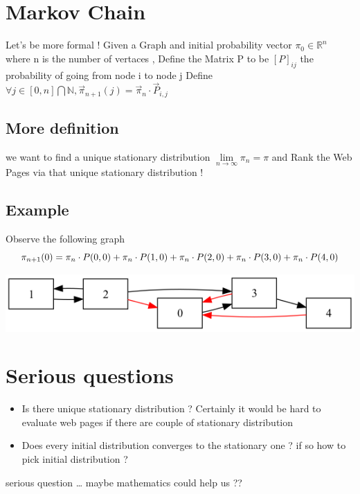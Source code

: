 \documentclass[11pt]{article}
\begin{document}
\section*{Markov Chain}
\label{sec:org1f68fba}
Let's be more formal !
Given a Graph and initial probability vector \(\pi _0 \in \mathbb{R}^n\)  where n is the number of vertaces ,
Define the Matrix P to be \([P]_{ij}\) the probability of going from node i to node j
Define \(\forall j \in [0,n]\bigcap \mathbb{N} , \vec \pi _{n+1} (j) = \vec \pi _n \cdot \vec P_{i,j}\)
\subsection*{More definition}
\label{sec:org8770bd6}
we want to find a unique stationary
distribution \(\lim\limits_{n\to \infty} \pi _n = \pi\) and Rank the Web Pages via that unique stationary distribution !

\subsection*{Example}
\label{sec:org2123d79}
Observe the following graph
\[ \pi _{n+1}(0) = \pi _n \cdot P(0,0) + \pi _n \cdot P(1,0) +\pi _n \cdot P(2,0) \\ +\pi _n \cdot P(3,0) + \pi _n \cdot P(4,0) \]

\begin{center}
\includegraphics[width=.9\linewidth]{markov_simple_calc.png}
\end{center}



\section*{Serious questions}
\label{sec:org7d9549c}
\begin{itemize}
\item Is there unique stationary distribution ?
Certainly it would be hard to evaluate web pages if there are couple of stationary distribution
\item Does every initial distribution converges to the stationary one ?
if so how to pick initial distribution ?
\end{itemize}
serious question \ldots{} maybe mathematics could help us ??
\end{document}

